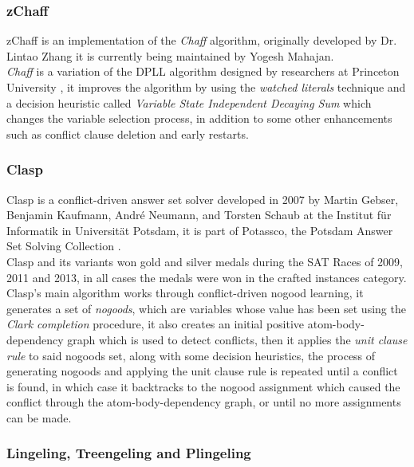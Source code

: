 \subsubsection{zChaff}

zChaff is an implementation of the \textit{Chaff} algorithm, originally developed by Dr. Lintao Zhang it is currently being maintained by Yogesh Mahajan.
\\\textit{Chaff} is a variation of the DPLL algorithm designed by researchers at Princeton University \parencite{Moskewicz2001}, it improves the algorithm by using the \textit{watched literals} technique and a decision heuristic called \textit{Variable State Independent Decaying Sum} which changes the variable selection process, in addition to some other enhancements such as conflict clause deletion and early restarts.

\subsubsection{Clasp}

Clasp is a conflict-driven answer set solver developed in 2007 by Martin Gebser, Benjamin Kaufmann, André Neumann, and Torsten Schaub at the Institut für Informatik in Universität Potsdam, it is part of Potassco, the Potsdam Answer Set Solving Collection \parencite{Gebser2007}.
\\Clasp and its variants won gold and silver medals during the SAT Races of 2009, 2011 and 2013, in all cases the medals were won in the crafted instances category.
\\Clasp's main algorithm works through conflict-driven nogood learning, it generates a set of \textit{nogoods}, which are variables whose value has been set using the \textit{Clark completion} procedure, it also creates an initial positive atom-body-dependency graph which is used to detect conflicts, then it applies the \textit{unit clause rule} to said nogoods set, along with some decision heuristics, the process of generating nogoods and applying the unit clause rule is repeated until a conflict is found, in which case it backtracks to the nogood assignment which caused the conflict through the atom-body-dependency graph, or until no more assignments can be made.

\subsubsection{Lingeling, Treengeling and Plingeling}

